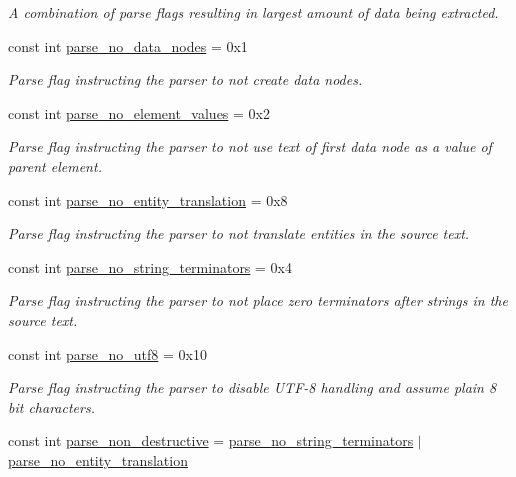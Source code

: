 \begin{DoxyCompactItemize}
\begin{DoxyCompactList}\small\item\em A combination of parse flags resulting in largest amount of data being extracted. \end{DoxyCompactList}\item 
const int \mbox{\hyperlink{namespacerapidxml_a87e8bbab53702cf3b438bd553c10b6b9}{parse\+\_\+no\+\_\+data\+\_\+nodes}} = 0x1
\begin{DoxyCompactList}\small\item\em Parse flag instructing the parser to not create data nodes. \end{DoxyCompactList}\item 
const int \mbox{\hyperlink{namespacerapidxml_a97e2c4fdc04fae17126f9971a4fc993e}{parse\+\_\+no\+\_\+element\+\_\+values}} = 0x2
\begin{DoxyCompactList}\small\item\em Parse flag instructing the parser to not use text of first data node as a value of parent element. \end{DoxyCompactList}\item 
const int \mbox{\hyperlink{namespacerapidxml_a7223b7815c4fb8b42e6e4e77e1ea6b97}{parse\+\_\+no\+\_\+entity\+\_\+translation}} = 0x8
\begin{DoxyCompactList}\small\item\em Parse flag instructing the parser to not translate entities in the source text. \end{DoxyCompactList}\item 
const int \mbox{\hyperlink{namespacerapidxml_a9cae3801e70437cbc410c24bf6be691c}{parse\+\_\+no\+\_\+string\+\_\+terminators}} = 0x4
\begin{DoxyCompactList}\small\item\em Parse flag instructing the parser to not place zero terminators after strings in the source text. \end{DoxyCompactList}\item 
const int \mbox{\hyperlink{namespacerapidxml_accde57f6054857ee4042a1b4d98c83b9}{parse\+\_\+no\+\_\+utf8}} = 0x10
\begin{DoxyCompactList}\small\item\em Parse flag instructing the parser to disable U\+T\+F-\/8 handling and assume plain 8 bit characters. \end{DoxyCompactList}\item 
const int \mbox{\hyperlink{namespacerapidxml_aa97ba1a0a79a6d66f4eef3612508d943}{parse\+\_\+non\+\_\+destructive}} = \mbox{\hyperlink{namespacerapidxml_a9cae3801e70437cbc410c24bf6be691c}{parse\+\_\+no\+\_\+string\+\_\+terminators}} $\vert$ \mbox{\hyperlink{namespacerapidxml_a7223b7815c4fb8b42e6e4e77e1ea6b97}{parse\+\_\+no\+\_\+entity\+\_\+translation}}

\end{DoxyCompactItemize}
